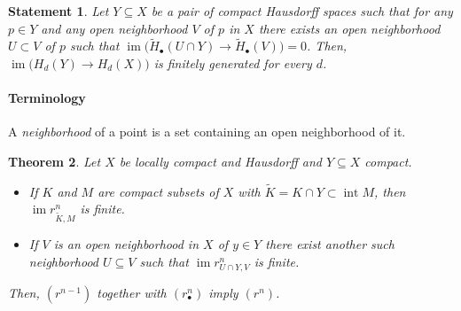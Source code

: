 \documentclass{amsart}
\newtheorem{theorem}{Theorem}
\newtheorem{statement}[theorem]{Statement}
\DeclareMathOperator{\im}{im}
\DeclareMathOperator{\interior}{int}
\begin{document}
	\begin{statement}
		Let $Y \subseteq X$ be a pair of compact Hausdorff spaces such that for any $p \in Y$ and any open neighborhood $V$ of $p$ in $X$ there exists an open neighborhood $U \subset V$ of $p$ such that $\im \big(\widetilde H_\bullet(U \cap Y) \to \widetilde H_\bullet(V)\big) = 0$. Then, $\im \big(H_d(Y) \to H_d(X)\big)$ is finitely generated for every $d$.
	\end{statement}
	
	\paragraph{Terminology} A \textit{neighborhood} of a point is a set containing an open neighborhood of it.
	
	\begin{theorem}
		Let $X$ be locally compact and Hausdorff and $Y \subseteq X$ compact.
		\begin{itemize}
			\item[$(r^n)$] If $K$ and $M$ are compact subsets of $X$ with $\widetilde K = K \cap Y \subset \interior M$, then $\im r^n_{\widetilde K, M}$ is finite.
			\item[$(r^n_\bullet)$] If $V$ is an open neighborhood in $X$ of $y \in Y$ there exist another such neighborhood $U \subseteq V$ such that $\im r^n_{U \cap Y, V}$ is finite.
		\end{itemize}
		Then, $(r^{n-1})$ together with $(r^n_\bullet)$ imply $(r^n)$.
	\end{theorem}
	
\end{document}
